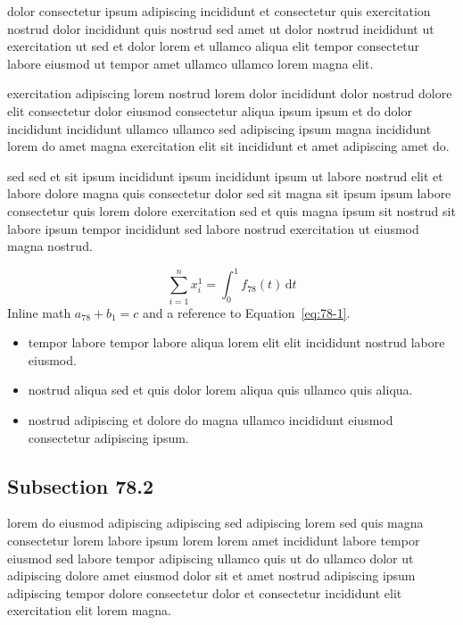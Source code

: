 \documentclass{article}
\begin{document}
dolor consectetur ipsum adipiscing incididunt et consectetur quis exercitation nostrud dolor incididunt quis nostrud sed amet ut dolor nostrud incididunt ut exercitation ut sed et dolor lorem et ullamco aliqua elit tempor consectetur labore eiusmod ut tempor amet ullamco ullamco lorem magna elit.

exercitation adipiscing lorem nostrud lorem dolor incididunt dolor nostrud dolore elit consectetur dolor eiusmod consectetur aliqua ipsum ipsum et do dolor incididunt incididunt ullamco ullamco sed adipiscing ipsum magna incididunt lorem do amet magna exercitation elit sit incididunt et amet adipiscing amet do.

sed sed et sit ipsum incididunt ipsum incididunt ipsum ut labore nostrud elit et labore dolore magna quis consectetur dolor sed sit magna sit ipsum ipsum labore consectetur quis lorem dolore exercitation sed et quis magna ipsum sit nostrud sit labore ipsum tempor incididunt sed labore nostrud exercitation ut eiusmod magna nostrud.

\begin{equation}\label{eq:78-1}
  \sum_{i=1}^{n} x_i^{1} = \int_0^1 f_{78}(t)\,\mathrm{d}t
\end{equation}
Inline math $a_{78} + b_{1} = c$ and a reference to Equation~\eqref{eq:78-1}.

\begin{itemize}
  \item tempor labore tempor labore aliqua lorem elit elit incididunt nostrud labore eiusmod.
  \item nostrud aliqua sed et quis dolor lorem aliqua quis ullamco quis aliqua.
  \item nostrud adipiscing et dolore do magna ullamco incididunt eiusmod consectetur adipiscing ipsum.
\end{itemize}

\subsection{Subsection 78.2}\label{sec:78-2}
lorem do eiusmod adipiscing adipiscing sed adipiscing lorem sed quis magna consectetur lorem labore ipsum lorem lorem amet incididunt labore tempor eiusmod sed labore tempor adipiscing ullamco quis ut do ullamco dolor ut adipiscing dolore amet eiusmod dolor sit et amet nostrud adipiscing ipsum adipiscing tempor dolore consectetur dolor et consectetur incididunt elit exercitation elit lorem magna.
\end{document}
